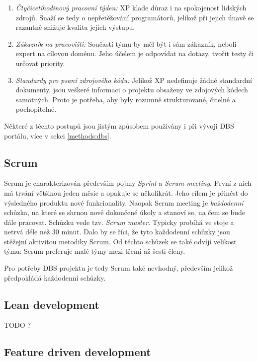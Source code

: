 \begin{enumerate}
	\item \emph{Čtyčicetihodinový pracovní týden:} XP klade důraz i na spokojenost lidských zdrojů. Snaží se tedy o nepřetěžování programátorů, jelikož při jejich únavě se razantně snižuje kvalita jejich výstupu.
	\item \emph{Zákazník na pracovišti:} Součastí týmu by měl být i sám zákazník, neboli expert na cílovou doménu. Jeho účelem je odpovídat na dotazy, tvořit testy či určovat priority.
	\item \emph{Standardy pro psaní zdrojového kódu:} Jelikož XP nedefinuje žádné standardní dokumenty, jsou veškeré informaci o projektu obsaženy ve zdojových kódech samotných. Proto je potřeba, aby byly rozumně strukturované, čitelné a pochopitelné.
\end{enumerate}

Některé z těchto postupů jsou jistým způsobem používány i při vývoji DBS portálu, více v sekci \ref{methods:dbs}.

\subsection{Scrum} \label{methods:scrum}

Scrum je charakterizován především pojmy \emph{Sprint} a \emph{Scrum meeting}. První z nich má trvání většinou jeden měsíc a opakuje se několikrát. Jeho cílem je přinést do výsledného produktu nové funkcionality. Naopak Scrum meeting je \emph{každodenní} schůzka, na které se shrnou nově dokončené úkoly a stanoví se, na čem se bude dále pracovat. Schůzku vede tzv. \emph{Scrum master}. Typicky probíhá ve stoje a netrvá déle než 30 minut. Dalo by se říci, že tyto každodenní schůzky jsou stěžejní aktivitou metodiky Scrum. Od těchto schůzek se také odvíjí velikost týmu: Scrum preferuje malé týmy mezi třemi až šesti členy.

Pro potřeby DBS projektu je tedy Scrum také nevhodný, především jelikož předpokládá každodenní schůzky.

\subsection{Lean development} \label{methods:lean}

TODO ?

\subsection{Feature driven development} \label{methods:fdd}

